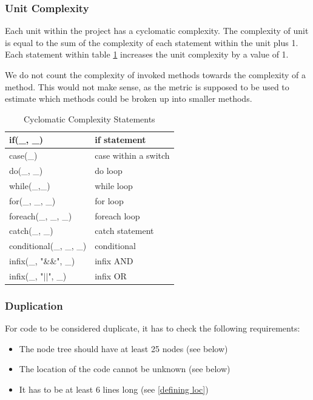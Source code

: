 \documentclass{article}
\begin{document}
\subsubsection{Unit Complexity}
Each unit within the project has a cyclomatic complexity. The complexity of unit is equal to the  sum of the complexity of each statement within the unit plus 1. Each statement within table \ref{complexityvalues} increases the unit complexity by a value of 1.

We do not count the complexity of invoked methods towards the complexity of a method. This would not make sense, as the metric is supposed to be used to estimate which methods could be broken up into smaller methods.

\begin{table}[h!tbp]
	\caption{Cyclomatic Complexity Statements}
	\label{complexityvalues}
	\begin{tabular}{l|l}	
		\hline
		if(\_, \_)					&			if statement \\
		\hline
		case(\_)					&			case within a switch \\
		\hline
		do(\_, \_)					&			do loop \\
		\hline
		while(\_,\_)				&			while loop \\
		\hline
		for(\_, \_, \_)				&			for loop \\
		\hline
		foreach(\_, \_, \_)			&			foreach loop \\
		\hline
		catch(\_, \_)				&			catch statement \\
		\hline
		conditional(\_, \_, \_)		&			conditional \\
		\hline
		infix(\_, "\&\&", \_)		&			infix AND \\
		\hline
		infix(\_, "\(||\)", \_)		&			infix OR \\
		\hline
	\end{tabular}
\end{table}

\subsubsection{Duplication} \label{dupereqs}
For code to be considered duplicate, it has to check the following requirements:
\begin{itemize}
\item The node tree should have at least 25 nodes (see below)
\item The location of the code cannot be unknown (see below)
\item It has to be at least 6 lines long (see \ref{defining loc})
\end{itemize}
\end{document}
